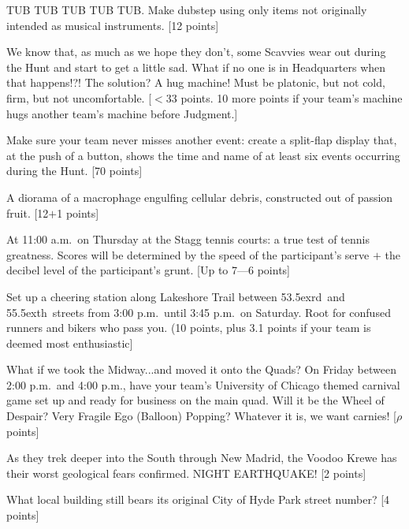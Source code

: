 \documentclass{book}
\def\th{\raise.5ex\hbox{\scriptsize th}}
\def\rd{\raise.5ex\hbox{\scriptsize rd}}
\begin{document}
\begin{list}{}{}
\item TUB TUB TUB TUB TUB.  Make dubstep using only items not originally intended as musical instruments. [12 points]

\item We know that, as much as we hope they don't, some Scavvies wear out during the Hunt and start to get a little sad.  What if no one is in Headquarters when that happens!?!  The solution? A hug machine!  Must be platonic, but not cold, firm, but not uncomfortable.  [$<$33 points. 10 more points if your team's machine hugs another team's machine before Judgment.]

\item Make sure your team never misses another event: create a split-flap display that, at the push of a button, shows  the time and name of at least six events occurring during the Hunt. [70 points]

\item A diorama of a macrophage engulfing cellular debris, constructed out of passion fruit. [12$+$1 points]

\item At 11:00 a.m.\ on Thursday at the Stagg tennis courts: a true test of tennis greatness.  Scores will be determined by the speed of the participant's serve $+$ the decibel level of the participant's grunt. [Up to 7---6 points] 

\item Set up a cheering station along Lakeshore Trail between 53\rd\ and 55\th\ streets from  3:00 p.m.\ until 3:45 p.m.\ on Saturday.  Root for confused runners and bikers who pass you.  (10 points, plus 3.1 points if your team is deemed most enthusiastic]

\item What if we took the Midway...and moved it onto the Quads?  On Friday between 2:00 p.m.\ and 4:00 p.m., have your team's University of Chicago themed carnival game set up and ready for business on the main quad.  Will it be the Wheel of Despair?  Very Fragile Ego (Balloon) Popping?  Whatever it is, we want carnies! [$\rho$ points] 

\item As they trek deeper into the South through New Madrid, the Voodoo Krewe has their worst geological fears confirmed. NIGHT EARTHQUAKE! [2 points]


\newpage



\item What local building still bears its original City of Hyde Park street number? [4 points]


\end{list}
\end{document}
